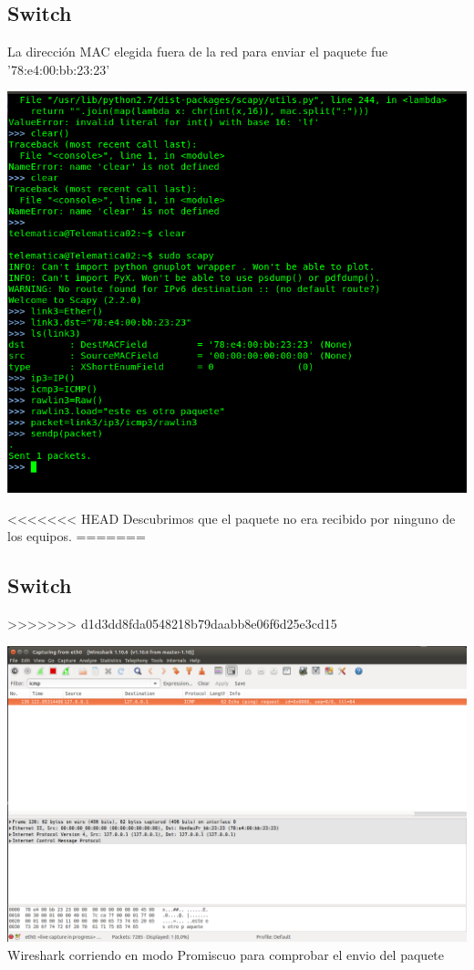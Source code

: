 \documentclass[spanish]{udpreport}
\begin{document}
\subsection{Switch}

La dirección MAC elegida fuera de la red para enviar el paquete fue '78:e4:00:bb:23:23'

\begin{center}
	\includegraphics[scale=.37]{imagenes/Switch/Test_3.png}
\end{center}

<<<<<<< HEAD
Descubrimos que el paquete no era recibido por ninguno de los equipos.
=======

\newpage
\subsection{Switch}
>>>>>>> d1d3dd8fda0548218b79daabb8e06f6d25e3cd15

\begin{center}
	\includegraphics[scale=.27]{imagenes/Switch/Test_3_Wireshark.png}
	\\ Wireshark corriendo en modo Promiscuo para comprobar el envio del paquete
\end{center}
\end{document}
